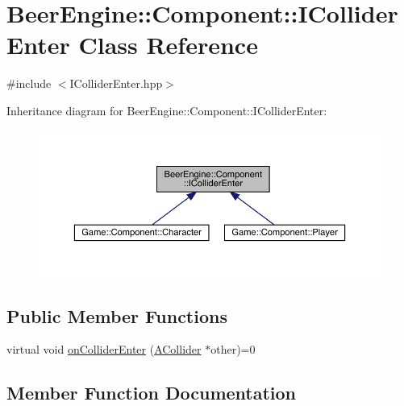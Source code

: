 \hypertarget{class_beer_engine_1_1_component_1_1_i_collider_enter}{}\section{Beer\+Engine\+:\+:Component\+:\+:I\+Collider\+Enter Class Reference}
\label{class_beer_engine_1_1_component_1_1_i_collider_enter}


{\ttfamily \#include $<$I\+Collider\+Enter.\+hpp$>$}



Inheritance diagram for Beer\+Engine\+:\+:Component\+:\+:I\+Collider\+Enter\+:
\nopagebreak
\begin{figure}[H]
\begin{center}
\leavevmode
\includegraphics[width=350pt]{class_beer_engine_1_1_component_1_1_i_collider_enter__inherit__graph}
\end{center}
\end{figure}
\subsection*{Public Member Functions}
\begin{DoxyCompactItemize}
\item 
virtual void \mbox{\hyperlink{class_beer_engine_1_1_component_1_1_i_collider_enter_a2b1d3e4210b12de57f70368a8a9b6686}{on\+Collider\+Enter}} (\mbox{\hyperlink{class_beer_engine_1_1_component_1_1_a_collider}{A\+Collider}} $\ast$other)=0
\end{DoxyCompactItemize}


\subsection{Member Function Documentation}
\mbox{\label{class_beer_engine_1_1_component_1_1_i_collider_enter_a2b1d3e4210b12de57f70368a8a9b6686}} 
